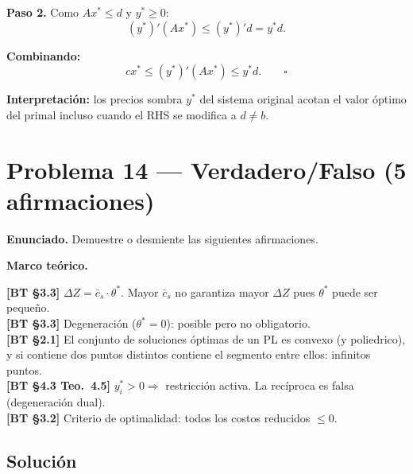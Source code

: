 \documentclass{article}
\newenvironment{marco}{\begin{mdframed}[linecolor=black!40,backgroundcolor=gray!5]\small\textbf{Marco teórico.}\par\smallskip}{\end{mdframed}\medskip}
\begin{document}
\textbf{Paso 2.} Como $Ax^* \leq d$ y $y^* \geq 0$:
\[
  (y^*)'(Ax^*) \leq (y^*)'d = y^*d.
\]

\textbf{Combinando:}
\[
  \boxed{cx^* \leq (y^*)'(Ax^*) \leq y^*d.} \qquad \square
\]

\textbf{Interpretación:} los precios sombra $y^*$ del sistema original acotan el valor óptimo del primal incluso cuando el RHS se modifica a $d \neq b$.

\section*{Problema 14 --- Verdadero/Falso (5 afirmaciones)}

\textbf{Enunciado.} Demuestre o desmiente las siguientes afirmaciones.

\begin{marco}
\textbf{[BT §3.3]} $\Delta Z = \bar{c}_s \cdot \theta^*$. Mayor $\bar{c}_s$ no garantiza mayor $\Delta Z$ pues $\theta^*$ puede ser pequeño. \\[2pt]
\textbf{[BT §3.3]} Degeneración ($\theta^* = 0$): posible pero no obligatorio. \\[2pt]
\textbf{[BT §2.1]} El conjunto de soluciones óptimas de un PL es convexo (y poliedrico), y si contiene dos puntos distintos contiene el segmento entre ellos: infinitos puntos. \\[2pt]
\textbf{[BT §4.3 Teo.\ 4.5]} $y_i^* > 0 \Rightarrow$ restricción activa. La recíproca es falsa (degeneración dual). \\[2pt]
\textbf{[BT §3.2]} Criterio de optimalidad: todos los costos reducidos $\leq 0$.
\end{marco}

\subsection*{Solución}
\end{document}
